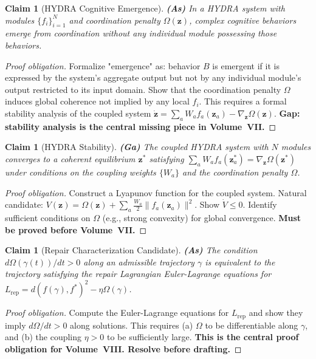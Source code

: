 \documentclass[11pt, a4paper]{book}
\theoremstyle{flyxion}
\newtheorem{claim}[theorem]{Claim}
\theoremstyle{remark}
\begin{document}
\begin{claim}[HYDRA Cognitive Emergence] \textbf{(As)}
In a HYDRA system with modules $\{f_i\}_{i=1}^N$ and coordination
penalty $\Omega(\mathbf{z})$, complex cognitive behaviors emerge
from coordination without any individual module possessing those
behaviors.
\end{claim}
\begin{proof}[Proof obligation]
Formalize "emergence" as: behavior $B$ is emergent if it is
expressed by the system's aggregate output but not by any individual
module's output restricted to its input domain. Show that the
coordination penalty $\Omega$ induces global coherence not implied
by any local $f_i$. This requires a formal stability analysis of the
coupled system $\dot{\mathbf{z}} = \sum_a W_a f_a(\mathbf{z}_a)
- \nabla_\mathbf{z}\Omega(\mathbf{z})$. \textbf{Gap: stability
analysis is the central missing piece in Volume~VII.}
\end{proof}

\begin{claim}[HYDRA Stability] \textbf{(Ga)}
The coupled HYDRA system with $N$ modules converges to a coherent
equilibrium $\mathbf{z}^*$ satisfying $\sum_a W_a f_a(\mathbf{z}^*_a)
= \nabla_\mathbf{z}\Omega(\mathbf{z}^*)$ under conditions on the
coupling weights $\{W_a\}$ and the coordination penalty $\Omega$.
\end{claim}
\begin{proof}[Proof obligation]
Construct a Lyapunov function for the coupled system. Natural
candidate: $V(\mathbf{z}) = \Omega(\mathbf{z}) +
\sum_a\frac{W_a}{2}\|f_a(\mathbf{z}_a)\|^2$. Show $\dot V \leq 0$.
Identify sufficient conditions on $\Omega$ (e.g., strong convexity)
for global convergence. \textbf{Must be proved before Volume~VII.}
\end{proof}

\begin{claim}[Repair Characterization Candidate] \textbf{(As)}
The condition $d\Omega(\gamma(t))/dt > 0$ along an admissible
trajectory $\gamma$ is equivalent to the trajectory satisfying the
repair Lagrangian Euler-Lagrange equations for
$L_\mathrm{rep} = d(f(\gamma),f^*)^2 - \eta\Omega(\gamma)$.
\end{claim}
\begin{proof}[Proof obligation]
Compute the Euler-Lagrange equations for $L_\mathrm{rep}$ and show
they imply $d\Omega/dt > 0$ along solutions. This requires
(a) $\Omega$ to be differentiable along $\gamma$, and (b) the
coupling $\eta > 0$ to be sufficiently large. \textbf{This is the
central proof obligation for Volume~VIII. Resolve before drafting.}
\end{proof}
\end{document}
